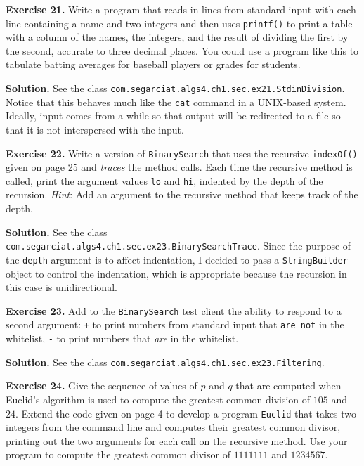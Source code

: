 \documentclass[12pt, a4paper]{article}
\newenvironment{ex}[2][Exercise]
{\par\medskip\noindent \textbf{#1 #2.}}
{\medskip}
\newenvironment{sol}[1][Solution]
{\par\medskip\noindent \textbf{#1.} }
{\medskip}
\begin{document}
	\begin{ex}{21}
		Write a program that reads in lines from standard input with each line containing
		a name and two integers and then uses \texttt{printf()} to print a table with a column
		of the names, the integers, and the result of dividing the first by the second,
		accurate to three decimal places. You could use a program like this to tabulate batting
		averages for baseball players or grades for students.
	\end{ex}
	\begin{sol}
		See the class \texttt{com.segarciat.algs4.ch1.sec.ex21.StdinDivision}. Notice
		that this behaves much like the \texttt{cat} command in a  UNIX-based system.
		Ideally, input comes from a while so that  output will be redirected to a file so
		that it is not interspersed with the input.
	\end{sol}
	\begin{ex}{22}
		Write a version of \texttt{BinarySearch} that uses the recursive \texttt{indexOf()}
		given on page 25 and \emph{traces} the method calls. Each time the recursive method
		is called, print the argument values \texttt{lo} and \texttt{hi}, indented by the depth
		of the recursion. \emph{Hint}: Add an argument to the recursive method that keeps track
		of the depth.
	\end{ex}
	\begin{sol}
		See the class \texttt{com.segarciat.algs4.ch1.sec.ex23.BinarySearchTrace}. Since the
		purpose of the \texttt{depth} argument is to affect indentation, I decided to
		pass a \texttt{StringBuilder} object to control the indentation, which
		is appropriate because the recursion in this case is unidirectional.
	\end{sol}
	\begin{ex}{23}
		Add to the \texttt{BinarySearch} test client the ability to respond to
		a second argument: \texttt{+} to print numbers from standard input that
		\texttt{are not} in the whitelist,  \texttt{-} to print numbers that \emph{are}
		in the whitelist.
	\end{ex}
	\begin{sol}
		See the class \texttt{com.segarciat.algs4.ch1.sec.ex23.Filtering}.
	\end{sol}
	\begin{ex}{24}
		Give the sequence of values of $p$ and $q$ that are computed when Euclid's
		algorithm is used to compute  the greatest common division of $105$ and $24$. Extend
		the code given on page 4 to develop a program \texttt{Euclid} that takes two integers
		from the command  line and computes their greatest common divisor, printing out the
		two arguments for each call on the recursive method. Use your program to compute the
		greatest common divisor of $1111111$ and $1234567$.
	\end{ex}
\end{document}
